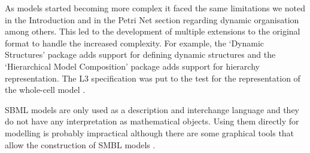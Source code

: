 As models started becoming more complex it faced the same limitations we noted
in the Introduction and in the Petri Net section regarding dynamic organisation
among others. This led to the development of multiple extensions to the original
format \citep[SBML L3;][]{sbmlL3} to handle the increased complexity. For
example, the `Dynamic Structures' package adds support for defining dynamic
structures and the `Hierarchical Model Composition' package adds support for
hierarchy representation. The L3 specification was put to the test for the
representation of the \citet{karr_whole-cell_2012} whole-cell model
\citep{waltemath_toward_2016}.

SBML models are only used as a description and interchange language and they do
not have any interpretation as mathematical objects. Using them directly for
modelling is probably impractical although there are some graphical tools that
allow the construction of SMBL models \citep{hoops_copasicomplex_2006}.



